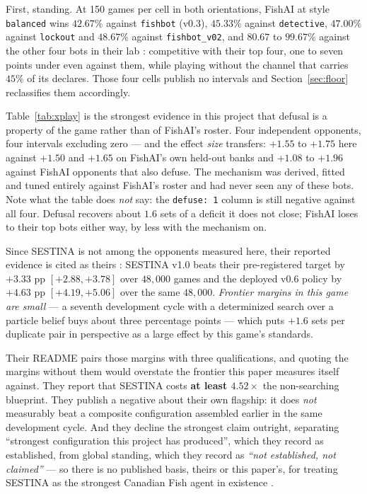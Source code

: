 \documentclass[11pt]{article}
\newcommand{\code}[1]{\texttt{#1}}
\begin{document}
First, standing. At 150 games per cell in both orientations, FishAI at style \code{balanced} wins
$42.67\%$ against \code{fishbot} (v0.3), $45.33\%$ against \code{detective}, $47.00\%$ against
\code{lockout} and $48.67\%$ against \code{fishbot\_v02}, and $80.67$ to $99.67\%$ against the other
four bots in their lab \cite{crossplay}: competitive with their top four, one to seven points under
even against them, while playing without the channel that carries $45\%$ of its declares. Those four
cells publish no intervals and Section~\ref{sec:floor} reclassifies them accordingly.

Table~\ref{tab:xplay} is the strongest evidence in this project that defusal is a property of the
game rather than of FishAI's roster. Four independent opponents, four intervals excluding zero ---
and the effect \emph{size} transfers: $+1.55$ to $+1.75$ here against $+1.50$ and $+1.65$ on
FishAI's own held-out banks and $+1.08$ to $+1.96$ against FishAI opponents that also defuse. The
mechanism was derived, fitted and tuned entirely against FishAI's roster and had never seen any of
these bots. Note what the table does \emph{not} say: the \code{defuse: 1} column is still negative
against all four. Defusal recovers about $1.6$ sets of a deficit it does not close; FishAI loses to
their top bots either way, by less with the mechanism on.

Since SESTINA is not among the opponents measured here, their reported evidence is cited as theirs
\cite{fishlabs,crossplay}: SESTINA v1.0 beats their pre-registered target by $+3.33$ pp $[+2.88,
+3.78]$ over $48{,}000$ games and the deployed v0.6 policy by $+4.63$ pp $[+4.19, +5.06]$ over the
same $48{,}000$. \emph{Frontier margins in this game are small} --- a seventh development cycle with
a determinized search over a particle belief buys about three percentage points --- which puts
$+1.6$ sets per duplicate pair in perspective as a large effect by this game's standards.

Their README pairs those margins with three qualifications, and quoting the margins without them
would overstate the frontier this paper measures itself against. They report that SESTINA costs
\textbf{at least $4.52\times$} the non-searching blueprint. They publish a negative about their own
flagship: it does \emph{not} measurably beat a composite configuration assembled earlier in the same
development cycle. And they decline the strongest claim outright, separating ``strongest
configuration this project has produced'', which they record as established, from global standing,
which they record as \emph{``not established, not claimed''} --- so there is no published basis,
theirs or this paper's, for treating SESTINA as the strongest Canadian Fish agent in existence
\cite{fishlabs,crossplay}.
\end{document}
